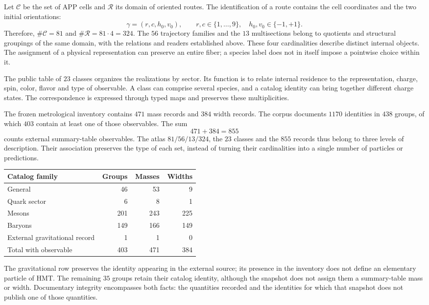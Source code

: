 Let \(\mathcal C\) be the set of APP cells and \(\mathcal R\) its domain
of oriented routes. The identification of a route contains the cell
coordinates and the two initial orientations:
\[
 \gamma=(r,c,h_0,v_0),\qquad
 r,c\in\{1,\ldots,9\},\quad h_0,v_0\in\{-1,+1\}.
\]
Therefore, \(\#\mathcal C=81\) and \(\#\mathcal R=81\cdot4=324\).
The \(56\) trajectory families and the \(13\) multisections belong
to quotients and structural groupings of the same domain, with the
relations and readers established above. These four cardinalities
describe distinct internal objects. The assignment of a physical
representation can preserve an entire fiber; a species label does not
in itself impose a pointwise choice within it.

The public table of \(23\) classes organizes the realizations by sector.
Its function is to relate internal residence to the representation,
charge, spin, color, flavor and type of observable. A class can
comprise several species, and a catalog identity can bring together
different charge states. The correspondence is expressed through typed
maps and preserves these multiplicities.

The frozen metrological inventory contains \(471\) mass records and
\(384\) width records. The corpus documents \(1170\) identities in \(438\)
groups, of which \(403\) contain at least one of those observables.
The sum
\[
 471+384=855
\]
counts external summary-table observables. The atlas \(81/56/13/324\),
the \(23\) classes and the \(855\) records thus belong to three levels
of description. Their association preserves the type of each set, instead
of turning their cardinalities into a single number of particles or predictions.

\begin{center}
\begin{tabular}{p{0.49\linewidth}rrr}
\toprule
Catalog family & Groups & Masses & Widths\\
\midrule
General & 46 & 53 & 9\\
Quark sector & 6 & 8 & 1\\
Mesons & 201 & 243 & 225\\
Baryons & 149 & 166 & 149\\
External gravitational record & 1 & 1 & 0\\
\midrule
Total with observable & 403 & 471 & 384\\
\bottomrule
\end{tabular}
\end{center}

The gravitational row preserves the identity appearing in the external source;
its presence in the inventory does not define an elementary particle of HMT.
The remaining \(35\) groups retain their catalog identity, although
the snapshot does not assign them a summary-table mass or width. Documentary
integrity encompasses both facts: the quantities recorded and the identities
for which that snapshot does not publish one of those quantities.

